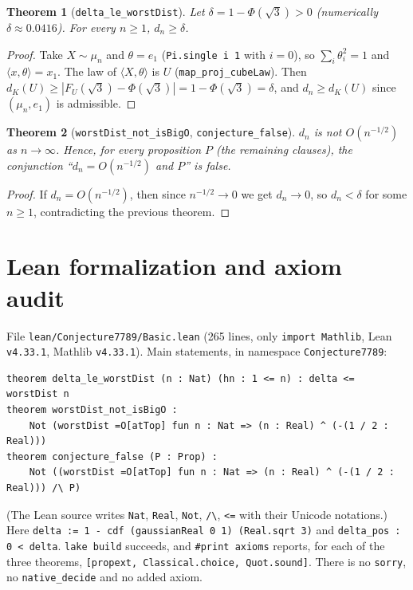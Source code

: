 \documentclass[11pt]{article}
\newtheorem{theorem}{Theorem}
\theoremstyle{definition}
\begin{document}
\begin{theorem}[\texttt{delta\_le\_worstDist}]
Let $\delta = 1-\Phi(\sqrt3)>0$ (numerically $\delta\approx0.0416$). For every $n\ge1$,
$d_n\ge\delta$.
\end{theorem}
\begin{proof}
Take $X\sim\mu_n$ and $\theta=e_1$ (\texttt{Pi.single i 1} with $i=0$), so
$\sum_i\theta_i^2=1$ and $\langle x,\theta\rangle=x_1$. The law of $\langle X,\theta\rangle$ is
$U$ (\texttt{map\_proj\_cubeLaw}). Then $d_K(U)\ge|F_U(\sqrt3)-\Phi(\sqrt3)|=1-\Phi(\sqrt3)=\delta$,
and $d_n\ge d_K(U)$ since $(\mu_n,e_1)$ is admissible.
\end{proof}

\begin{theorem}[\texttt{worstDist\_not\_isBigO}, \texttt{conjecture\_false}]
$d_n$ is not $O(n^{-1/2})$ as $n\to\infty$. Hence, for every proposition $P$ (the remaining
clauses), the conjunction ``$d_n=O(n^{-1/2})$ and $P$'' is false.
\end{theorem}
\begin{proof}
If $d_n=O(n^{-1/2})$, then since $n^{-1/2}\to0$ we get $d_n\to0$, so $d_n<\delta$ for some
$n\ge1$, contradicting the previous theorem.
\end{proof}

\section{Lean formalization and axiom audit}

File \texttt{lean/Conjecture7789/Basic.lean} (265 lines, only \texttt{import Mathlib}, Lean
\texttt{v4.33.1}, Mathlib \texttt{v4.33.1}). Main statements, in namespace \texttt{Conjecture7789}:
\begin{verbatim}
theorem delta_le_worstDist (n : Nat) (hn : 1 <= n) : delta <= worstDist n
theorem worstDist_not_isBigO :
    Not (worstDist =O[atTop] fun n : Nat => (n : Real) ^ (-(1 / 2 : Real)))
theorem conjecture_false (P : Prop) :
    Not ((worstDist =O[atTop] fun n : Nat => (n : Real) ^ (-(1 / 2 : Real))) /\ P)
\end{verbatim}
(The Lean source writes \texttt{Nat}, \texttt{Real}, \texttt{Not}, \texttt{/\textbackslash},
\texttt{<=} with their Unicode notations.) Here
\texttt{delta := 1 - cdf (gaussianReal 0 1) (Real.sqrt 3)} and \texttt{delta\_pos : 0 < delta}.
\texttt{lake build} succeeds, and \texttt{\#print axioms} reports, for each of the three theorems,
\texttt{[propext, Classical.choice, Quot.sound]}. There is no \texttt{sorry}, no
\texttt{native\_decide} and no added axiom.
\end{document}
